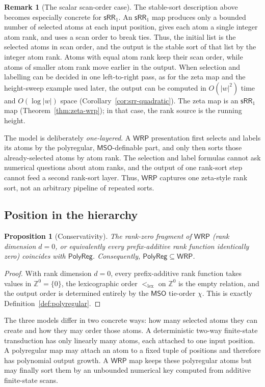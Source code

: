 \documentclass[11pt]{article}
\newtheorem{proposition}[theorem]{Proposition}
\theoremstyle{definition}
\newtheorem{remark}[theorem]{Remark}
\newcommand{\Z}{\mathbb Z}
\newcommand{\WRP}{\mathsf{WRP}}
\newcommand{\SWR}{\mathsf{sRR}_1}
\newcommand{\MSO}{\mathsf{MSO}}
\newcommand{\polyreg}{\mathsf{PolyReg}}
\begin{document}
\begin{remark}[The scalar scan-order case]
The stable-sort description above becomes especially concrete for $\SWR$.
An $\SWR$ map produces only a bounded number of selected atoms at each input
position, gives each atom a single integer atom rank, and uses a scan order to
break ties.  Thus, the initial list is the selected atoms in scan order, and the
output is the stable sort of that list by the integer atom rank.  Atoms with
equal atom rank keep their scan order, while atoms of smaller atom rank move
earlier in the output.
When selection and labelling can be decided in one left-to-right pass, as for
the zeta map and the height-sweep example used later, the output can be computed in
$O(|w|^2)$ time and $O(\log|w|)$ space
(Corollary~\ref{cor:srr-quadratic}).  The zeta map is an $\SWR$ map
(Theorem~\ref{thm:zeta-wrp}); in that case, the rank source is the running
height.
\end{remark}

The model is deliberately \emph{one-layered}.  A $\WRP$ presentation first
selects and labels its atoms by the polyregular, $\MSO$-definable part, and
only then sorts those already-selected atoms by atom rank.  The selection and
label formulas cannot ask numerical questions about atom ranks, and the output of one
rank-sort step cannot feed a second rank-sort layer.  Thus, $\WRP$ captures one
zeta-style rank sort, not an arbitrary pipeline of repeated sorts.

\subsection{Position in the hierarchy}

\begin{proposition}[Conservativity]
\label{prop:conservative}
The rank-zero fragment of $\WRP$ (rank dimension $d=0$, or equivalently
every prefix-additive rank function identically zero) coincides with $\polyreg$.
Consequently, $\polyreg\subseteq\WRP$.
\end{proposition}

\begin{proof}
With rank dimension $d=0$, every prefix-additive rank function takes values in
$\Z^0=\{0\}$, the lexicographic order $<_{\mathrm{lex}}$ on $\Z^0$ is the empty
relation, and the output order is determined entirely by the $\MSO$
tie-order $\chi$.  This is exactly Definition~\ref{def:polyregular}.
\end{proof}

The three models differ in two concrete ways: how many selected atoms they can
create and how they may order those atoms.  A deterministic two-way
finite-state transduction has only linearly many atoms, each attached to one
input position.  A polyregular map may attach an atom to a fixed tuple of
positions and therefore has polynomial output growth.  A $\WRP$ map keeps
these polyregular atoms but may finally sort them by an unbounded numerical
key computed from additive finite-state scans.
\end{document}

